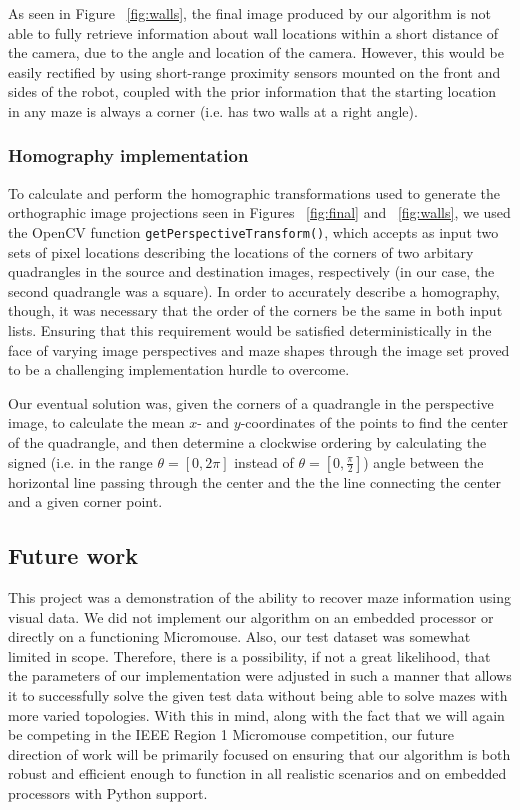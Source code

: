 \documentclass[10pt,twocolumn,letterpaper]{article}
\begin{document}
As seen in Figure ~\ref{fig:walls}, the final image produced by our algorithm is not able to fully retrieve information
about wall locations within a short distance of the camera, due to the angle and location of the camera.  However, this
would be easily rectified by using short-range proximity sensors mounted on the front and sides of the robot, coupled
with the prior information that the starting location in any maze is always a corner (i.e. has two walls at a right
angle).

\subsubsection{Homography implementation} %
\label{ssub:homography_implementation}

To calculate and perform the homographic transformations used to generate the orthographic image projections seen in
Figures ~\ref{fig:final} and ~\ref{fig:walls}, we used the OpenCV function \texttt{getPerspectiveTransform()}, which
accepts as input two sets of pixel locations describing the locations of the corners of two arbitary quadrangles in the
source and destination images, respectively (in our case, the second quadrangle was a square).  In order to accurately
describe a homography, though, it was necessary that the order of the corners be the same in both input lists.  Ensuring
that this requirement would be satisfied deterministically in the face of varying image perspectives and maze shapes
through the image set proved to be a challenging implementation hurdle to overcome.

Our eventual solution was, given the corners of a quadrangle in the perspective image, to calculate the mean $x$- and
$y$-coordinates of the points to find the center of the quadrangle, and then determine a clockwise ordering by
calculating the signed (i.e. in the range $\theta = [0, 2\pi]$ instead of $\theta = [0, \frac{\pi}{2}]$) angle between
the horizontal line passing through the center and the the line connecting the center and a given corner point.

\subsection{Future work}
\label{sub:futurework}

This project was a demonstration of the ability to recover maze information using visual data.  We did not implement our
algorithm on an embedded processor or directly on a functioning Micromouse.  Also, our test dataset was somewhat limited
in scope.  Therefore, there is a possibility, if not a great likelihood, that the parameters of our implementation were
adjusted in such a manner that allows it to successfully solve the given test data without being able to solve mazes
with more varied topologies.  With this in mind, along with the fact that we will again be competing in the IEEE Region
1 Micromouse competition, our future direction of work will be primarily focused on ensuring that our algorithm is both
robust and efficient enough to function in all realistic scenarios and on embedded processors with Python support.

{\small


}
\end{document}
